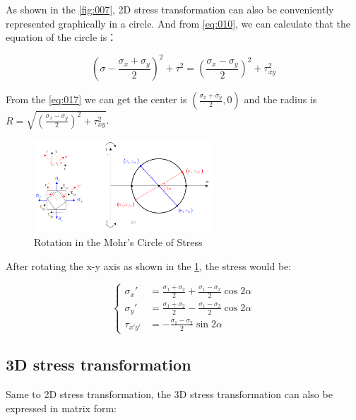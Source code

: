 \documentclass[en,hazy,cyan,8pt,normal]{elegantnote}
\numberwithin{equation}{section}
\begin{document}
    As shown in the \cref{fig:007}, 2D stress transformation can also be conveniently represented graphically in a circle. And from \cref{eq:010}, we can calculate that the equation of the circle is：

    \begin{equation}\label{eq:017}
      \left( \sigma - \frac{\sigma_x + \sigma_y}{2} \right)^2 + \tau^2 = \left( \frac{\sigma_x - \sigma_y}{2} \right)^2 + \tau_{xy}^2
    \end{equation}

    From the \cref{eq:017} we can get the center is $\displaystyle \left(\frac{\sigma_x + \sigma_y}{2}, 0\right)$ and the radius is $\displaystyle R=\sqrt{\left( \frac{\sigma_x - \sigma_y}{2} \right)^2 + \tau_{xy}^2}$.

    \begin{figure}[H]
      \centering
      \includegraphics[width=0.6\textwidth]{image/008.png}
      \caption{Rotation in the Mohr's Circle of Stress}
      \label{fig:008}
    \end{figure}

    After rotating the x-y axis as shown in the \cref{fig:008}, the stress would be:

    \begin{equation}\label{eq:018}
      \left\{
      \begin{aligned}
        \sigma_x'&=\frac{\sigma_1+\sigma_2}{2}+\frac{\sigma_1-\sigma_2}{2}\cos2\alpha\\
        \sigma_y'&=\frac{\sigma_1+\sigma_2}{2}-\frac{\sigma_1-\sigma_2}{2}\cos2\alpha\\
        \tau_{x'y'}&=-\frac{\sigma_1-\sigma_2}{2}\sin2\alpha
      \end{aligned}
      \right.
    \end{equation}
  
  \subsection{3D stress transformation}\label{subsec:01.07}
    Same to 2D stress transformation, the 3D stress transformation can also be expressed in matrix form:
\end{document}
